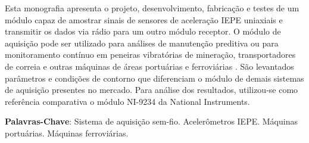 \documentclass[
	12pt,				%
	openright,			%
	twoside,			%
	a4paper,			%
	english,			%
	french,				%
	spanish,			%
	brazil,				%
	]{abntex2}
\begin{document}
\frenchspacing 


\imprimircapa

\imprimirfolhaderosto




\setlength{\absparsep}{18pt} %
\begin{resumo}
	Esta monografia apresenta o projeto, desenvolvimento, fabricação e testes de um módulo capaz de amostrar sinais de sensores de aceleração IEPE uniaxiais e transmitir os dados via rádio para um outro módulo receptor. O módulo de aquisição pode ser utilizado para análises de manutenção preditiva ou para monitoramento contínuo em peneiras vibratórias de mineração, transportadores de correia e outras máquinas de áreas portuárias e ferroviárias . São levantados parâmetros e condições de contorno que diferenciam o módulo de demais sistemas de aquisição presentes no mercado. Para análise dos resultados, utilizou-se como referência comparativa o módulo NI-9234 da National Instruments.

	\vspace{\onelineskip}

	\noindent 
	\textbf{Palavras-Chave}: Sistema de aquisição sem-fio. Acelerômetros IEPE. Máquinas portuárias. Máquinas ferroviárias.
\end{resumo}
\end{document}
